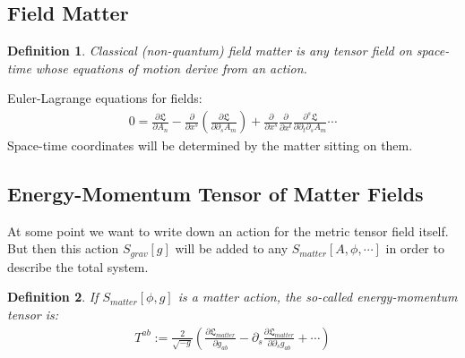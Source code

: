 \documentclass[10pt, oneside]{article}
\newtheorem{defn}{Definition}
\begin{document}
\subsection{Field Matter}
\begin{defn}
Classical (non-quantum) field matter is any tensor field on space-time whose equations of motion derive from an action. 
\end{defn}
Euler-Lagrange equations for fields:
\begin{align*}
   0=\frac{\partial \mathfrak{L}}{\partial A_n} - \frac{\partial}{\partial x^s}(\frac{\partial \mathfrak{L}}{\partial \partial_s A_m})+\frac{\partial}{\partial x^s}\frac{\partial}{\partial x^t}\frac{\partial^s \mathfrak{L}}{\partial \partial_t \partial_s A_m} \cdots
\end{align*}
Space-time coordinates will be determined by the matter sitting on them. 
\subsection{Energy-Momentum Tensor of Matter Fields}
At some point we want to write down an action for the metric tensor field itself. But then this action $S_{grav}[g]$ will be added to any $S_{matter}[A,\phi,\cdots]$ in order to describe the total system. 
\begin{defn}
If $S_{matter}[\phi,g]$ is a matter action, the so-called energy-momentum tensor is:
\begin{align*}
   T^{ab} := \frac{2}{\sqrt{-g}}(\frac{\partial \mathfrak{L}_{matter}}{\partial g_{ab}}-\partial_s \frac{\partial \mathfrak{L}_{matter}}{\partial \partial_s g_{ab}}+\cdots)
\end{align*}
\end{defn}


\end{document}
